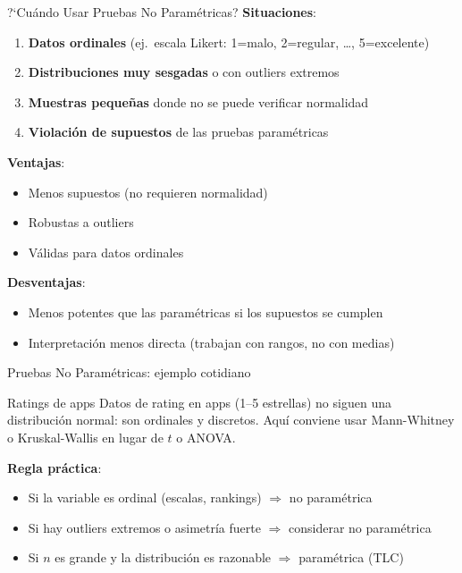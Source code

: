 \documentclass[aspectratio=169, 11pt]{beamer}
\begin{document}
\begin{frame}{?`Cu\'ando Usar Pruebas No Param\'etricas?}
\textbf{Situaciones}:
\begin{enumerate}
  \item \textbf{Datos ordinales} (ej.\ escala Likert: 1=malo, 2=regular, \ldots, 5=excelente)
  \item \textbf{Distribuciones muy sesgadas} o con outliers extremos
  \item \textbf{Muestras peque\~nas} donde no se puede verificar normalidad
  \item \textbf{Violaci\'on de supuestos} de las pruebas param\'etricas
\end{enumerate}

\vspace{0.3cm}
\textbf{Ventajas}:
\begin{itemize}
  \item Menos supuestos (no requieren normalidad)
  \item Robustas a outliers
  \item V\'alidas para datos ordinales
\end{itemize}

\vspace{0.3cm}
\textbf{Desventajas}:
\begin{itemize}
  \item \alert{Menos potentes} que las param\'etricas si los supuestos se cumplen
  \item Interpretaci\'on menos directa (trabajan con rangos, no con medias)
\end{itemize}
\end{frame}

\begin{frame}{Pruebas No Param\'etricas: ejemplo cotidiano}
\begin{exampleblock}{Ratings de apps}
Datos de rating en apps (1--5 estrellas) no siguen una distribuci\'on normal: son ordinales y discretos. Aqu\'i conviene usar Mann-Whitney o Kruskal-Wallis en lugar de $t$ o ANOVA.
\end{exampleblock}

\vspace{0.3cm}
\textbf{Regla pr\'actica}:
\begin{itemize}
  \item Si la variable es ordinal (escalas, rankings) $\Rightarrow$ no param\'etrica
  \item Si hay outliers extremos o asimetr\'ia fuerte $\Rightarrow$ considerar no param\'etrica
  \item Si $n$ es grande y la distribuci\'on es razonable $\Rightarrow$ param\'etrica (TLC)
\end{itemize}
\end{frame}
\end{document}
